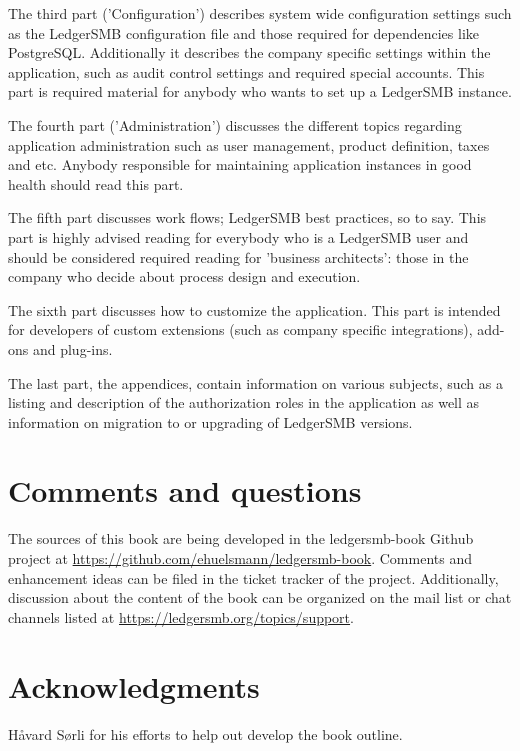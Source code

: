 \documentclass[10pt,a4paper]{book}
\begin{document}
The third part ('Configuration') describes system wide configuration settings such as
the LedgerSMB configuration file and those required for dependencies like PostgreSQL. Additionally
it describes the company specific settings within the application, such as audit control settings
and required special accounts. This part is required material for anybody who wants to set up
a LedgerSMB instance.

The fourth part ('Administration') discusses the different topics
regarding application administration such as user management, product definition, taxes and etc.
Anybody responsible for maintaining application instances in good health should read this part.

The fifth part discusses work flows; LedgerSMB best practices, so to say. This part is highly advised
reading for everybody who is a LedgerSMB user and should be considered required reading for 'business
architects': those in the company who decide about process design and execution.

The sixth part discusses how to customize the application. This part is intended for developers of
custom extensions (such as company specific integrations), add-ons and plug-ins.

The last part, the appendices, contain information on various subjects, such as a listing and description
of the authorization roles in the application as well as information on migration to or upgrading of
LedgerSMB versions.


\section*{Comments and questions}
\label{sec-comments}

The sources of this book are being developed in the ledgersmb-book Github project at
\url{https://github.com/ehuelsmann/ledgersmb-book}. Comments and enhancement ideas can be filed
in the ticket tracker of the project. Additionally, discussion about the content of the book
can be organized on the mail list or chat channels listed  at \url{https://ledgersmb.org/topics/support}.


\section*{Acknowledgments}
\label{sec-acknowledgements}

H{\aa}vard S{\o}rli for his efforts to help out develop the book outline.








\end{document}
